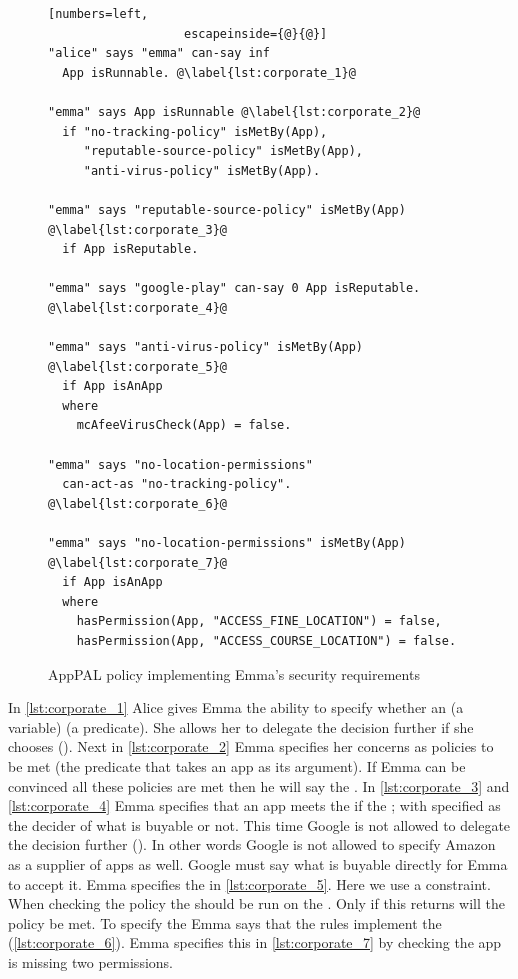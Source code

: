 \documentclass[]{scrartcl}
\begin{document}
\begin{figure}
\begin{lstlisting}[numbers=left,
                   escapeinside={@}{@}]
"alice" says "emma" can-say inf
  App isRunnable. @\label{lst:corporate_1}@

"emma" says App isRunnable @\label{lst:corporate_2}@
  if "no-tracking-policy" isMetBy(App),
     "reputable-source-policy" isMetBy(App),
     "anti-virus-policy" isMetBy(App).

"emma" says "reputable-source-policy" isMetBy(App) @\label{lst:corporate_3}@
  if App isReputable.

"emma" says "google-play" can-say 0 App isReputable. @\label{lst:corporate_4}@

"emma" says "anti-virus-policy" isMetBy(App) @\label{lst:corporate_5}@
  if App isAnApp
  where
    mcAfeeVirusCheck(App) = false.

"emma" says "no-location-permissions"
  can-act-as "no-tracking-policy". @\label{lst:corporate_6}@

"emma" says "no-location-permissions" isMetBy(App) @\label{lst:corporate_7}@
  if App isAnApp
  where
    hasPermission(App, "ACCESS_FINE_LOCATION") = false,
    hasPermission(App, "ACCESS_COURSE_LOCATION") = false.
\end{lstlisting}
\caption{AppPAL policy implementing Emma's security requirements}
\label{lst:corporate}
\end{figure}

In \autoref{lst:corporate_1} Alice gives Emma the ability to specify whether an  (a variable)  (a predicate).
She allows her to delegate the decision further if she chooses ().
Next in \autoref{lst:corporate_2} Emma specifies her concerns as policies to be met (the  predicate that takes an app as its argument).
If Emma can be convinced all these policies are met then he will say the .
In \autoref{lst:corporate_3} and \autoref{lst:corporate_4} Emma specifies that an app meets the  if the ;
  with  specified as the decider of what is buyable or not.
This time Google is not allowed to delegate the decision further ().
In other words Google is not allowed to specify Amazon as a supplier of apps as well.
Google must say what is buyable directly for Emma to accept it.
Emma specifies the  in \autoref{lst:corporate_5}.
Here we use a constraint.
When checking the policy the  should be run on the .
Only if this returns  will the policy be met.
To specify the  Emma says that the  rules implement the  (\autoref{lst:corporate_6}).
Emma specifies this in \autoref{lst:corporate_7} by checking the app is missing two permissions.
\end{document}
